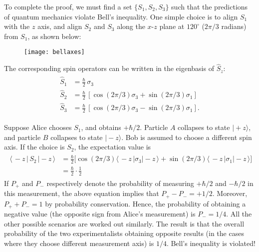 \documentclass[pra,12pt]{revtex4}
\begin{document}
To complete the proof, we must find a set $\{S_1, S_2, S_3\}$ such
that the predictions of quantum mechanics violate Bell's inequality.
One simple choice is to align $S_1$ with the $z$ axis, and align $S_2$
and $S_3$ along the $x$-$z$ plane at $120^\circ$ ($2\pi/3$ radians)
from $S_1$, as shown below:

\begin{figure}[h]
  \centering\texttt{[image: bellaxes]}
\end{figure}

The corresponding spin operators can be written in the eigenbasis of
$\hat{S}_z$:
\begin{align}
  \begin{aligned}\hat{S}_1 &= \frac{\hbar}{2} \, \sigma_3 \\ \hat{S}_2 &= \frac{\hbar}{2} \, \left[\cos(2\pi/3) \sigma_3 + \sin(2\pi/3)\sigma_1\right]  \\   \hat{S}_3 &= \frac{\hbar}{2} \, \left[\cos(2\pi/3) \sigma_3 - \sin(2\pi/3)\sigma_1\right].\end{aligned}
\end{align}

Suppose Alice chooses $S_1$, and obtains $+\hbar/2$.  Particle $A$
collapses to state $|\!+\!z\rangle$, and particle $B$ collapses to
state $|\!-\!z\rangle$.  Bob is assumed to choose a different spin
axis.  If the choice is $S_2$, the expectation value is
\begin{align}
  \begin{aligned}\langle\, - z \, | \, S_2 \,|-\!z\,\rangle &= \frac{\hbar}{2} \Big[\cos(2\pi/3) \langle\,- z\,|\sigma_3| - \!z\,\rangle + \sin(2\pi/3)\langle\,- z\,|\sigma_1|-\!z\,\rangle\Big]\\ &= \frac{\hbar}{2} \cdot \frac{1}{2} \end{aligned}
\end{align}
If $P_+$ and $P_-$ respectively denote the probability of measuring
$+\hbar/2$ and $-\hbar/2$ in this measurement, the above equation
implies that $P_+ - P_- = + 1/2$.  Moreover, $P_+ + P_- = 1$ by
probability conservation.  Hence, the probability of obtaining a
negative value (the opposite sign from Alice's measurement) is $P_- =
1/4$.  All the other possible scenarios are worked out similarly.  The
result is that the overall probability of the two experimentalists
obtaining opposite results (in the cases where they choose different
measurement axis) is $1/4$.  Bell's inequality is violated!
\end{document}
